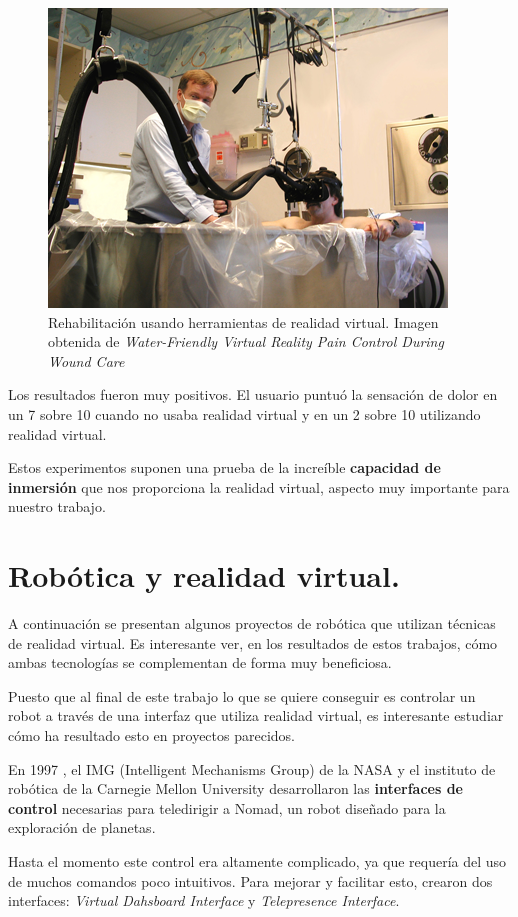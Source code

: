 \documentclass[twoside, 12pt]{epstfg}
\begin{document}
\begin{figure}[h]
	\centerline{
		\mbox{\includegraphics[width=.50\textwidth]{images/waterfriendly.png}}
	}
	\caption{Rehabilitación usando herramientas de realidad virtual. Imagen obtenida de \textit{Water-Friendly Virtual Reality Pain Control During Wound Care} \cite{JCLP:JCLP10244}}
	
\end{figure}

Los resultados fueron muy positivos. El usuario puntuó la sensación de dolor en un 7 sobre 10 cuando no usaba realidad virtual y en un 2 sobre 10 utilizando realidad virtual.\cite{JCLP:JCLP10244}

Estos experimentos suponen una prueba de la increíble \textbf{capacidad de inmersión} que nos proporciona la realidad virtual, aspecto muy importante para nuestro trabajo.


\section{Robótica y realidad virtual.} 
\label{sec:robotica y VR}

A continuación se presentan algunos proyectos de robótica que utilizan técnicas de realidad virtual. Es interesante ver, en los resultados de estos trabajos, cómo ambas tecnologías se complementan de forma muy beneficiosa.

Puesto que al final de este trabajo lo que se quiere conseguir es controlar un robot a través de una interfaz que utiliza realidad virtual, es interesante estudiar cómo ha resultado esto en proyectos parecidos.

En 1997 , el IMG (Intelligent Mechanisms Group) de la NASA y el instituto de robótica de la Carnegie Mellon University desarrollaron las \textbf{interfaces de control} necesarias para teledirigir a Nomad, un robot diseñado para la exploración de planetas. \cite{Nguyen2001}

Hasta el momento este control era altamente complicado, ya que requería del uso de muchos comandos poco intuitivos. Para mejorar y facilitar esto, crearon dos interfaces:\textit{ Virtual Dahsboard Interface} y \textit{Telepresence Interface}.
\end{document}
